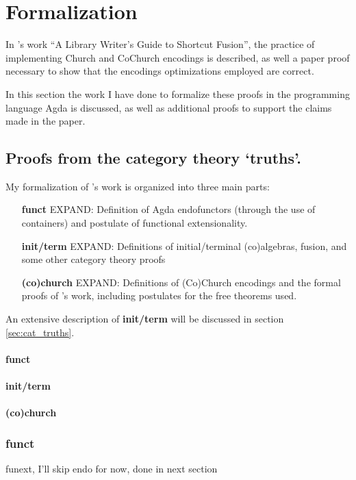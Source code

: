 \section{Formalization}
In \cite{Harper2011}'s work ``A Library Writer's Guide to Shortcut Fusion'', the practice of implementing Church and CoChurch encodings is described, as well a paper proof necessary to show that the encodings optimizations employed are correct.

In this section the work I have done to formalize these proofs in the programming language Agda is discussed, as well as additional proofs to support the claims made in the paper.

\subsection{Proofs from the category theory `truths'.}
My formalization of \cite{Harper2011}'s work is organized into three main parts:
\begin{itemize}
    \item[\textbf{funct}] EXPAND: Definition of Agda endofunctors (through the use of containers) and postulate of functional extensionality.
    \item[\textbf{init/term}] EXPAND: Definitions of initial/terminal (co)algebras, fusion, and some other category theory proofs
    \item[\textbf{(co)church}] EXPAND: Definitions of (Co)Church encodings and the formal proofs of \cite{Harper2011}'s work, including postulates for the free theorems used.
\end{itemize}
An extensive description of \textbf{init/term} will be discussed in section \ref{sec:cat_truths}.

\paragraph{funct}
\paragraph{init/term}
\paragraph{(co)church}

\subsubsection{funct}
funext, I'll skip endo for now, done in next section

